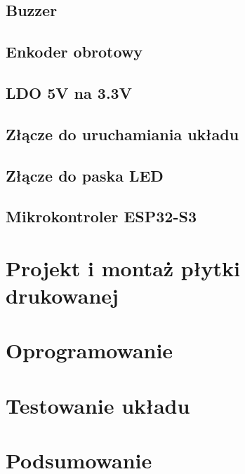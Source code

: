 \documentclass[twoside]{article}
\numberwithin{equation}{section}
\begin{document}
\subsection{Buzzer}

\newpage

\subsection{Enkoder obrotowy}

\newpage

\subsection{LDO 5V na 3.3V}

\newpage

\subsection{Złącze do uruchamiania układu}

\newpage

\subsection{Złącze do paska LED}

\newpage

\subsection{Mikrokontroler ESP32-S3}

\newpage

\section{Projekt i montaż płytki drukowanej}


\newpage

\section{Oprogramowanie}

\newpage

\section{Testowanie układu}
\label{sec:testy}

\newpage

\section{Podsumowanie}

\newpage
\end{document}
